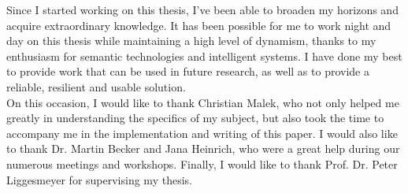 
Since I started working on this thesis, I've been able to broaden my horizons and acquire extraordinary knowledge. It has been possible for me to work night and day on this thesis while maintaining a high level of dynamism, thanks to my enthusiasm for semantic technologies and intelligent systems. I have done my best to provide work that can be used in future research, as well as to provide a reliable, resilient and usable solution.\\
On this occasion, I would like to thank Christian Malek, who not only helped me greatly in understanding the specifics of my subject, but also took the time to accompany me in the implementation and writing of this paper. I would also like to thank Dr. Martin Becker and Jana Heinrich, who were a great help during our numerous meetings and workshops. Finally, I would like to thank Prof. Dr. Peter Liggesmeyer for supervising my thesis.

